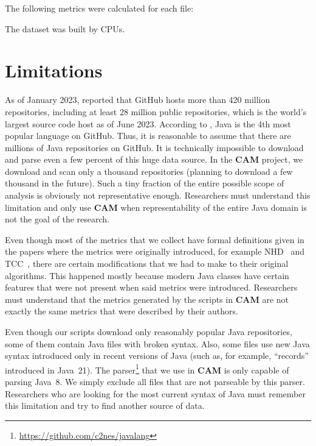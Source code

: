 \documentclass[sigplan,nonacm,review,anonymous]{acmart}
\newcommand\cam{{\sffamily\bfseries CAM}}
\begin{document}
The following
\unskip{}
metrics were
calculated for each  file:

\begin{itemize}
  
\end{itemize}

The dataset was built by
\unskip{}
CPUs\unskip{}.

\section{Limitations}\label{sec:limitations}

As of January 2023, \citet{dohmke2023} reported that GitHub hosts more than
420 million repositories, including at least 28 million public repositories,
which is the world's largest source code host as of June 2023. According
to \citep{daigle2023}, Java is the 4th most popular language on GitHub. Thus,
it is reasonable to assume that there are millions of Java repositories on
GitHub. It is technically impossible to download and parse even a few percent
of this huge data source. In the \cam{} project, we download and scan only a
thousand repositories (planning to download a few thousand in the future).
Such a tiny fraction of the entire possible scope of analysis is obviously
not representative enough. Researchers must understand this limitation and
only use \cam{} when representability of the entire Java domain is not the
goal of the research.

Even though most of the metrics that we collect have formal definitions
given in the papers where the metrics were originally introduced,
for example NHD~\citep{counsell2006interpretation} and
TCC~\citep{bieman1995cohesion}, there are certain modifications
that we had to make to their original algorithms. This happened mostly
because modern Java classes have certain features that were not present
when said metrics were introduced. Researchers must understand that
the metrics generated by the scripts in \cam{} are not exactly the same
metrics that were described by their authors.

Even though our scripts download only reasonably popular Java repositories,
some of them contain Java files with broken syntax. Also, some files use
new Java syntax introduced only in recent versions of Java (such as,
for example, ``records'' introduced in Java~21).
The parser\footnote{\url{https://github.com/c2nes/javalang}} that we use
in \cam{} is only capable of parsing Java~8. We simply exclude all files
that are not parseable by this parser. Researchers who are looking for
the most current syntax of Java must remember this limitation and try
to find another source of data.
\end{document}
